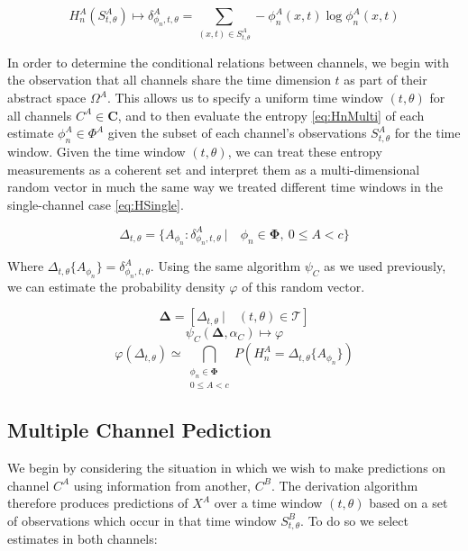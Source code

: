 \documentclass[10pt]{article}
\begin{document}
\begin{equation} \label{eq:HnMulti} H_n^A( S_{t,\theta}^A ) \mapsto \delta_{\phi_n,t,\theta}^A = \sum_{(x,t) \in S_{t,\theta}^A } -\phi_n^A(x,t) \log \phi_n^A(x,t) \end{equation}

In order to determine the conditional relations between channels, we begin with the observation that all channels share the time dimension \(t \) as part of their abstract space \(\Omega^A \).  This allows us to specify a uniform time window \((t,\theta) \) for all channels \(C^A \in \mathbf{C} \), and to then evaluate the entropy \ref{eq:HnMulti} of each estimate \(\phi_n^A \in \Phi^A \) given the subset of each channel's observations \(S_{t,\theta}^A \) for the time window.  Given the time window \((t,\theta) \), we can treat these entropy measurements as a coherent set and interpret them as a multi-dimensional random vector in much the same way we treated different time windows in the single-channel case \ref{eq:HSingle}.

\[
\Delta_{t,\theta} = \{ A_{\phi_n} : \delta_{\phi_n,t,\theta}^A \ | \quad \phi_n \in \boldsymbol{\Phi}, \ 0 \le A < c \}
\]

Where \( \Delta_{t,\theta} \{ A_{\phi_n} \} = \delta_{\phi_n,t,\theta}^A \). Using the same algorithm \(\psi_C \) as we used previously, we can estimate the probability density \(\varphi \) of this random vector. 

\[ \boldsymbol{\Delta} = [ \Delta_{t,\theta} \ | \quad (t,\theta) \in \mathcal{T} ] \]
\begin{equation} \psi_C( \boldsymbol{\Delta} , \alpha_C ) \mapsto \varphi \end{equation}
\[ \varphi( \Delta_{t,\theta} ) \simeq \bigcap_{\substack{ \phi_n \in \boldsymbol{\Phi} \\ 0 \le A < c }} P( H_n^A = \Delta_{t,\theta}\{A_{\phi_n} \} ) \]

\subsection{Multiple Channel Pediction}
We begin by considering the situation in which we wish to make predictions on channel \(C^A \) using information from another, \(C^B \).  The derivation algorithm therefore produces predictions of \(X^A \) over a time window \((t,\theta) \) based on a set of observations which occur in that time window \(S_{t,\theta}^B \).  To do so we select estimates in both channels:
\end{document}
